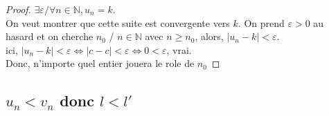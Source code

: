\documentclass[a4paper,10pt]{book}
\begin{document}
  \begin{proof}
    $\exists \varepsilon / \forall n \in \mathbb{N}, u_n = k$.\\
    On veut montrer que cette suite est convergente vers $k$. On prend $\varepsilon > 0$ au hasard et on cherche $n_0$ / $n \in \mathbb{N}$ avec $n \geq n_0$, alors, $|u_n - k| < \varepsilon$.\\
    ici, $|u_n - k| < \varepsilon \Leftrightarrow |c - c| < \varepsilon \Leftrightarrow 0 < \varepsilon$, vrai. \\
    Donc, n'importe quel entier jouera le role de $n_0$
  \end{proof}

  \newpage

  \subsection{$u_n < v_n$ donc $l < l'$}
  \label{sub:$u_n < v_n$ donc $l < l'$}
\end{document}
